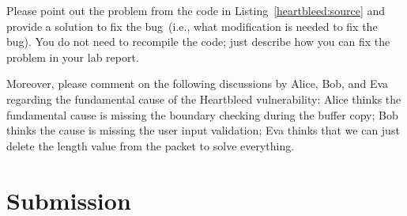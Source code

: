 Please point out the problem from the code in
Listing~\ref{heartbleed:source} and provide a solution to fix the
bug~(i.e., what modification is needed to fix the bug). You do not need to
recompile the code; just describe how you can fix the problem in your lab
report. 


Moreover, please comment on the following discussions by Alice, Bob, and
Eva regarding the fundamental cause of the Heartbleed vulnerability: 
Alice thinks the fundamental cause is missing the
boundary checking during the buffer copy; Bob thinks the cause is missing the
user input validation; Eva thinks that we can just delete the length value
from the packet to solve everything. 




\section{Submission}

\seedsubmission



